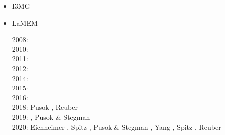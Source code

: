 \begin{itemize}
\begin{scriptsize}
      \cite{staj16}\\
\twothousandseventeen: \cite{mauw17}\cite{kocb17}\cite{vomc17}\cite{shwl17}\\
\twothousandeighteen: Gorczyk \etal \cite{gomb18}, \cite{zhlg18}
                      \cite{masg18}\cite{gebu18}
                      \cite{hegv18}, Dal Zilio \etal \cite{davg18}\\
\twothousandnineteen: Koptev \etal \cite{kobg19}, Li \etal \cite{ligc19},
                      Sizova \etal \cite{sihf19}, Menant \etal \cite{meag19},
                      Gulcher \etal \cite{gubg19}, van Zelst \etal \cite{vawg19},
                      Zhong \etal \cite{zhli19}\\
\twothousandtwenty: Baes \etal \cite{basg20}, Zhou \etal \cite{zhlg20}, 
                    Dai \etal \cite{dawl20}, Chowdhury \etal \cite{chcg20},
                    Menant \etal \cite{meag20}, Chen \etal \cite{chlc20}, Munch \etal \cite{mugu20}, 
                    Tang \etal \cite{tacm20}, G{\"u}lcher \etal \cite{gugm20}, Brizzi \etal \cite{brvf20}, 
                    Peral \etal \cite{perz20}, Petrini \etal \cite{pegy20}, 
                    Baes \etal \cite{basg20b}, D'acquisto \etal \cite{dadm20},
                    Perchuk \etal \cite{pegz20}, Ruh \cite{ruh20}, Schierjott \etal \cite{sctr20}
\end{scriptsize}


\item I3MG

{\small
\noindent
\cite{facc14}
}

\item LaMEM 

\begin{scriptsize}
2008: \cite{scbe08}\\
2010: \cite{kamm10}\\
2011: \cite{lemk11}\\
2012: \cite{may12}\\
2014: \cite{lesh14}\cite{cokm14}\cite{bakp14}\cite{feka14a}\cite{feka14b}\\
2015: \cite{puka15}\cite{feka15}\cite{cofk15}\\
2016: \cite{kapb16}\cite{coyc16}\\
2018: Pusok \etal \cite{pukp18}, Reuber \etal \cite{rekp18}\\
2019: \cite{eitp19}\cite{hooi19}, Pusok \& Stegman \cite{pust19}\\
2020: Eichheimer \etal \cite{eitf20}, Spitz \etal \cite{spsk20}, Pusok \& Stegman \cite{pust20}, 
      Yang \etal \cite{yakl20}, Spitz \etal \cite{spbe20}, Reuber \etal \cite{rehp20}
\end{scriptsize}


\end{itemize}
